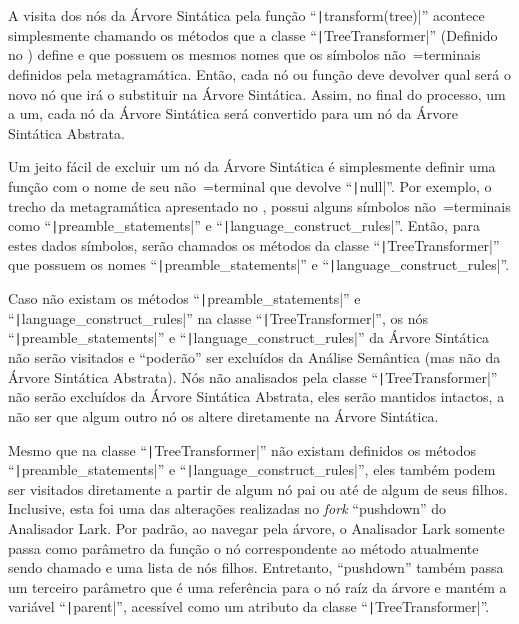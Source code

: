 A visita dos nós da Árvore Sintática pela função ``\texttt|transform(tree)|'' acontece simplesmente chamando os métodos que a classe ``\texttt|TreeTransformer|'' (Definido no ) define e
que possuem os mesmos nomes que os símbolos não~=terminais definidos pela metagramática.
Então,
cada nó ou
função deve devolver qual será o novo nó que irá o substituir na Árvore Sintática.
Assim,
no final do processo,
um a um,
cada nó da Árvore Sintática será convertido para um nó da Árvore Sintática Abstrata.

Um jeito fácil de excluir um nó da Árvore Sintática é simplesmente definir uma função com o nome de seu não~=terminal que devolve ``\texttt|null|''.
Por exemplo,
o trecho da metagramática apresentado no ,
possui alguns símbolos não~=terminais como ``\texttt|preamble_statements|'' e
``\texttt|language_construct_rules|''. Então,
para estes dados símbolos,
serão chamados os métodos da classe ``\texttt|TreeTransformer|'' que possuem os nomes ``\texttt|preamble_statements|'' e
``\texttt|language_construct_rules|''.

Caso não existam os métodos ``\texttt|preamble_statements|'' e
``\texttt|language_construct_rules|'' na classe ``\texttt|TreeTransformer|'',
os nós ``\texttt|preamble_statements|'' e
``\texttt|language_construct_rules|'' da Árvore Sintática não serão visitados e
``poderão'' ser excluídos da Análise Semântica (mas não da Árvore Sintática Abstrata).
Nós não analisados pela classe ``\texttt|TreeTransformer|'' não serão excluídos da Árvore Sintática Abstrata,
eles serão mantidos intactos,
a não ser que algum outro nó os altere diretamente na Árvore Sintática.

Mesmo que na classe ``\texttt|TreeTransformer|'' não existam definidos os métodos ``\texttt|preamble_statements|'' e
``\texttt|language_construct_rules|'',
eles também podem ser visitados diretamente a partir de algum nó pai ou
até de algum de seus filhos.
Inclusive,
esta foi uma das alterações realizadas no \textit{fork} ``pushdown'' do Analisador Lark.
Por padrão,
ao navegar pela árvore,
o Analisador Lark somente passa como parâmetro da função o nó correspondente ao método atualmente sendo chamado e
uma lista de nós filhos.
Entretanto,
``pushdown'' também passa um terceiro parâmetro que é uma referência para o nó raíz da árvore e
mantém a variável ``\texttt|parent|'',
acessível como um atributo da classe ``\texttt|TreeTransformer|''.



